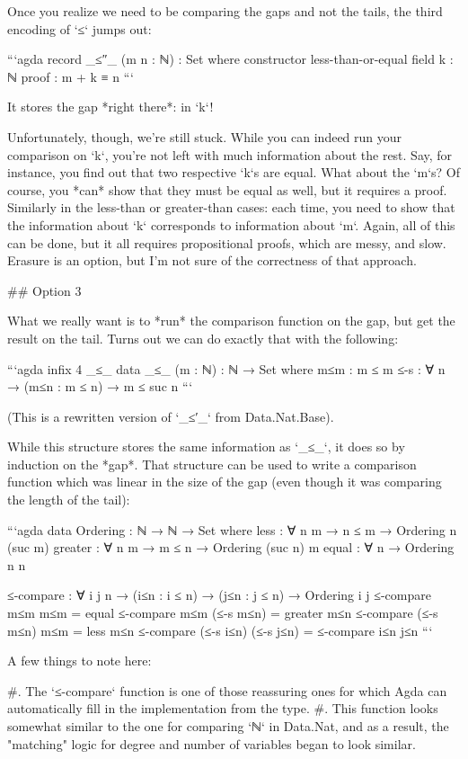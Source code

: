 \documentclass{article}
\begin{document}
Once you realize we need to be comparing the gaps and not the tails, the third
encoding of `≤` jumps out:

```agda
record _≤″_ (m n : ℕ) : Set where
  constructor less-than-or-equal
  field
    {k}   : ℕ
    proof : m + k ≡ n
```

It stores the gap *right there*: in `k`!

Unfortunately, though, we're still stuck. While you can indeed run your
comparison on `k`, you're not left with much information about the rest. Say,
for instance, you find out that two respective `k`s are equal. What about the
`m`s? Of course, you *can* show that they must be equal as well, but it requires
a proof. Similarly in the less-than or greater-than cases: each time, you need
to show that the information about `k` corresponds to information about `m`.
Again, all of this can be done, but it all requires propositional proofs, which
are messy, and slow. Erasure is an option, but I'm not sure of the correctness
of that approach.

## Option 3

What we really want is to *run* the comparison function on the gap, but get the
result on the tail. Turns out we can do exactly that with the following:

```agda
infix 4 _≤_
data _≤_ (m : ℕ) : ℕ → Set where
  m≤m : m ≤ m
  ≤-s : ∀ {n} → (m≤n : m ≤ n) → m ≤ suc n
```

(This is a rewritten version of `_≤′_` from Data.Nat.Base).

While this structure stores the same information as `_≤_`, it does so by
induction on the *gap*. That structure can be used to write a comparison
function which was linear in the size of the gap (even though it was comparing
the length of the tail):

```agda
data Ordering : ℕ → ℕ → Set where
  less    : ∀ {n m} → n ≤ m → Ordering n (suc m)
  greater : ∀ {n m} → m ≤ n → Ordering (suc n) m
  equal   : ∀ {n}           → Ordering n n

≤-compare : ∀ {i j n}
          → (i≤n : i ≤ n)
          → (j≤n : j ≤ n)
          → Ordering i j
≤-compare m≤m m≤m = equal
≤-compare m≤m (≤-s m≤n) = greater m≤n
≤-compare (≤-s m≤n) m≤m = less m≤n
≤-compare (≤-s i≤n) (≤-s j≤n) = ≤-compare i≤n j≤n
```

A few things to note here:

#. The `≤-compare` function is one of those reassuring ones for which Agda can
automatically fill in the implementation from the type.
#. This function looks somewhat similar to the one for comparing `ℕ` in Data.Nat,
and as a result, the "matching" logic for degree and number of variables began
to look similar.
\end{document}
